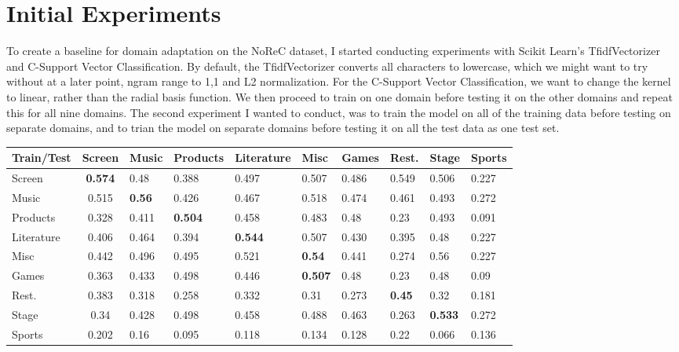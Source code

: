 \section{Initial Experiments}
To create a baseline for domain adaptation on the NoReC dataset, I started conducting experiments with Scikit Learn's TfidfVectorizer and C-Support Vector Classification. By default, the TfidfVectorizer converts all characters to lowercase, which we might want to try without at a later point, ngram range to 1,1 and L2 normalization. For the C-Support Vector Classification, we want to change the kernel to linear, rather than the radial basis function. We then proceed to train on one domain before testing it on the other domains and repeat this for all nine domains. The second experiment I wanted to conduct, was to train the model on all of the training data before testing on separate domains, and to trian the model on separate domains before testing it on all the test data as one test set.\\
\begin{table}[]
	\begin{tabular}{|l|c|l|l|l|l|l|l|l|l|}
		\hline
		Train/Test & \multicolumn{1}{l|}{Screen}& Music     	 & Products       & Literature 		& Misc 	  		& Games 		& Rest.         & Stage  		& Sports        \\ \hline
		Screen     & \textbf{0.574}             & 0.48           & 0.388          & 0.497	   		& 0.507    		& 0.486			& 0.549         & 0.506  		& 0.227			\\ \hline
		Music	   & 0.515                      & \textbf{0.56}  & 0.426          & 0.467 	   		& 0.518    		& 0.474 		& 0.461         & 0.493  		& 0.272 	   \\ \hline
		Products   & 0.328                      & 0.411			 & \textbf{0.504} & 0.458 	   		& 0.483    		& 0.48	 		& 0.23          & 0.493  		& 0.091        \\ \hline
		Literature & 0.406                      & 0.464          & 0.394          & \textbf{0.544}	& 0.507    		& 0.430 		& 0.395 		& 0.48  		& 0.227		\\ \hline
		Misc  	   & 0.442                      & 0.496 		 & 0.495          & 0.521 	   		& \textbf{0.54}	& 0.441 		& 0.274         & 0.56   		& 0.227   	\\ \hline
		Games      & 0.363                      & 0.433          & 0.498          & 0.446 	   		& \textbf{0.507} & 0.48			& 0.23          & 0.48   		& 0.09 		  \\ \hline
		Rest.      & 0.383 						& 0.318          & 0.258          & 0.332 	   		& 0.31    		& 0.273 		& \textbf{0.45}& 0.32	  		& 0.181        \\ \hline
		Stage      & 0.34 						& 0.428          & 0.498          & 0.458 	   		& 0.488    		& 0.463 		& 0.263			& \textbf{0.533}& 0.272  	\\ \hline
		Sports     & 0.202 						& 0.16           & 0.095          & 0.118 	   		& 0.134    		& 0.128 		& 0.22          & 0.066  		& 0.136   \\ \hline
	\end{tabular}
\end{table}
